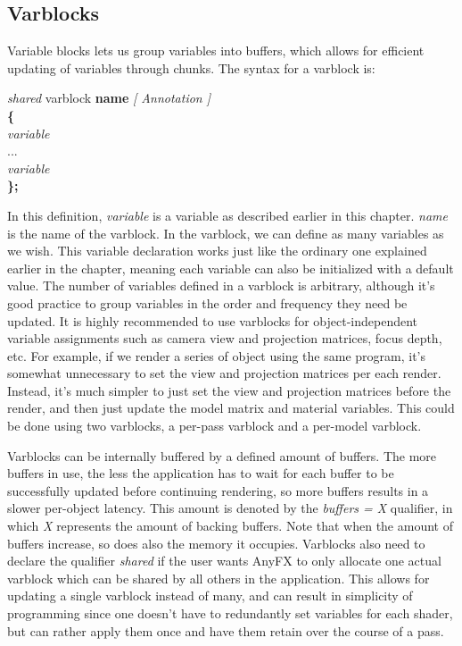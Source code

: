\documentclass{article}
\newcommand{\SyntaxBox}[1]
{	
	\begin{center}
	\colorbox{orange!60}
	{
		\begin{minipage}{\linewidth}
		\hfill
		\begin{tabbing}
		#1
		\end{tabbing}
		\end{minipage}
	}
	\end{center}
}
\begin{document}
\subsection{Varblocks}
Variable blocks lets us group variables into buffers, which allows for efficient updating of variables through chunks. The syntax for a varblock is:

\SyntaxBox
{
	\textit{shared} varblock \textbf{name} \textit{[ Annotation ]} \\
	\textbf{\{} \= \\
	\>	\textit{variable} \\
	\>	...	\\
	\>	\textit{variable} \\
	\textbf{\};}
}

In this definition, \textit{variable} is a variable as described earlier in this chapter. \textit{name} is the name of the varblock. In the varblock, we can define as many variables as we wish. This variable declaration works just like the ordinary one explained earlier in the chapter, meaning each variable can also be initialized with a default value. The number of variables defined in a varblock is arbitrary, although it's good practice to group variables in the order and frequency they need be updated. It is highly recommended to use varblocks for object-independent variable assignments such as camera view and projection matrices, focus depth, etc. For example, if we render a series of object using the same program, it's somewhat unnecessary to set the view and projection matrices per each render. Instead, it's much simpler to just set the view and projection matrices before the render, and then just update the model matrix and material variables. This could be done using two varblocks, a per-pass varblock and a per-model varblock. 

Varblocks can be internally buffered by a defined amount of buffers. The more buffers in use, the less the application has to wait for each buffer to be successfully updated before continuing rendering, so more buffers results in a slower per-object latency. This amount is denoted by the \textit{buffers = X} qualifier, in which \textit{X} represents the amount of backing buffers. Note that when the amount of buffers increase, so does also the memory it occupies. Varblocks also need to declare the qualifier \textit{shared} if the user wants AnyFX to only allocate one actual varblock which can be shared by all others in the application. This allows for updating a single varblock instead of many, and can result in simplicity of programming since one doesn't have to redundantly set variables for each shader, but can rather apply them once and have them retain over the course of a pass. 
\end{document}
